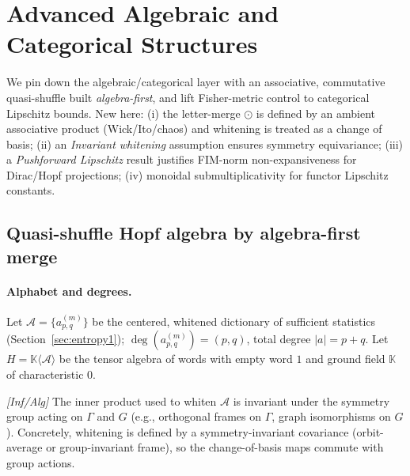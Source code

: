 \section{Advanced Algebraic and Categorical Structures}\label{sec:adv-structures1}

We pin down the algebraic/categorical layer with an associative, commutative quasi-shuffle built \emph{algebra-first}, and lift Fisher-metric control to categorical Lipschitz bounds. New here:
(i) the letter-merge $\odot$ is defined by an ambient associative product (Wick/Ito/chaos) and whitening is treated as a change of basis; 
(ii) an \emph{Invariant whitening} assumption ensures symmetry equivariance; 
(iii) a \emph{Pushforward Lipschitz} result justifies FIM-norm non-expansiveness for Dirac/Hopf projections; 
(iv) monoidal submultiplicativity for functor Lipschitz constants.

\setcounter{lemma}{11}
\setcounter{theorem}{3}

\subsection{Quasi-shuffle Hopf algebra by algebra-first merge}\label{sec:hopf}

\paragraph{Alphabet and degrees.}
Let $\mathcal A=\{a^{(m)}_{p,q}\}$ be the centered, whitened dictionary of sufficient statistics (Section~\ref{sec:entropy1}); $\deg(a^{(m)}_{p,q})=(p,q)$, total degree $|a|=p+q$. Let $H=\mathbb K\langle \mathcal A\rangle$ be the tensor algebra of words with empty word $1$ and ground field $\mathbb K$ of characteristic $0$.

\begin{assumption}\label{ass:inv-whiten}
\emph{[\textup{Inf/Alg}]}
The inner product used to whiten $\mathcal A$ is invariant under the symmetry group acting on $\Gamma$ and $G$ (e.g., orthogonal frames on $\Gamma$, graph isomorphisms on $G$). Concretely, whitening is defined by a symmetry-invariant covariance (orbit-average or group-invariant frame), so the change-of-basis maps commute with group actions.
\end{assumption}

